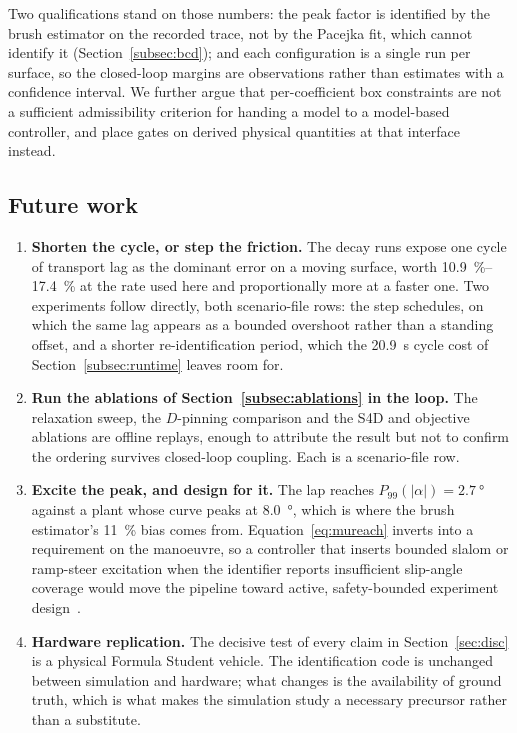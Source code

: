 Two qualifications stand on those numbers: the peak factor is identified by the
brush estimator on the recorded trace, not by the Pacejka fit, which cannot
identify it (Section~\ref{subsec:bcd}); and each configuration is a single run
per surface, so the closed-loop margins are observations rather than estimates
with a confidence interval. We further argue that per-coefficient box
constraints are not a sufficient admissibility criterion for handing a model to
a model-based controller, and place gates on derived physical quantities at
that interface instead.

\subsection{Future work}

\begin{enumerate}
\item \textbf{Shorten the cycle, or step the friction.} The decay runs expose
one cycle of transport lag as the dominant error on a moving surface, worth
\SIrange{10.9}{17.4}{\percent} at the rate used here and proportionally more at
a faster one. Two experiments follow directly, both scenario-file rows: the step
schedules, on which the same lag appears as a bounded overshoot rather than a
standing offset, and a shorter re-identification period, which the
\SI{20.9}{\second} cycle cost of Section~\ref{subsec:runtime} leaves room for.
\item \textbf{Run the ablations of Section~\ref{subsec:ablations} in the loop.}
The relaxation sweep, the $D$-pinning comparison and the S4D and objective
ablations are offline replays, enough to attribute the result but not to confirm
the ordering survives closed-loop coupling. Each is a scenario-file row.
\item \textbf{Excite the peak, and design for it.} The lap reaches
$P_{99}(|\alpha|)=\SI{2.7}{\degree}$ against a plant whose curve peaks at
\SI{8.0}{\degree}, which is where the brush estimator's \SI{11}{\percent} bias
comes from. Equation~\eqref{eq:mureach} inverts into a requirement on the
manoeuvre, so a controller that inserts bounded slalom or ramp-steer excitation
when the identifier reports insufficient slip-angle coverage would move the
pipeline toward active, safety-bounded experiment
design~\cite{goodwin1977design}.
\item \textbf{Hardware replication.} The decisive test of every claim in
Section~\ref{sec:disc} is a physical Formula Student vehicle. The identification
code is unchanged between simulation and hardware; what changes is the
availability of ground truth, which is what makes the simulation study a
necessary precursor rather than a substitute.
\end{enumerate}
